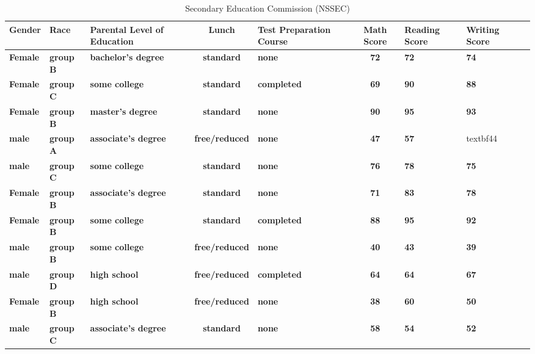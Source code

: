 \documentclass{article}
\begin{document}
	
\begin{table}[h!]
	\begin{center}
	  \caption{Secondary Education Commission (NSSEC)}
	  \label{tab:Class project 1}
	  \begin{tabular}{|l|m{1.4cm}|m{1.8cm}|c|m{1.6cm}|c|m{1.3cm}|m{1.5cm}|m{1.5cm}|}
	  	\hline
        \textbf{Gender} & \textbf{Race} & \textbf {Parental Level of Education} & \textbf{Lunch} & \textbf{Test Preparation Course} &
	  	\textbf{Math Score} & \textbf{Reading Score} & \textbf{Writing Score}\\ 
	  	\hline
	  	\textbf{Female} & \textbf{group B} & \textbf{bachelor's degree} & \textbf{standard} & \textbf{none} & \textbf{72} & \textbf{72} & \textbf{74}\\ 
	  	\hline
	  	\textbf{Female} & \textbf{group C} & \textbf{some college} & \textbf{standard} & \textbf{completed} & \textbf{69} & \textbf{90} & \textbf{88}\\
	  	\hline
	  	\textbf{Female} & \textbf{group B} & \textbf{master's degree} & \textbf{standard} & \textbf{none} & \textbf{90} & \textbf{95} & \textbf{93}\\
	  	\hline
	  	\textbf{male} & \textbf{group A} & \textbf{associate's degree} & \textbf{free/reduced} & \textbf{none} & \textbf{47} & \textbf{57} & textbf{44}\\
	  	\hline
	  	\textbf{male} & \textbf{group C} & \textbf{some college} & \textbf{standard} & \textbf{none} & \textbf{76} & \textbf{78} & \textbf{75}\\
	  	\hline
	  	\textbf{Female} & \textbf{group B} & \textbf{associate's degree} & \textbf{standard} & \textbf{none} & \textbf{71} & \textbf{83} & \textbf{78}\\
	  	\hline
	  	\textbf{Female} & \textbf{group B} & \textbf{some college} & \textbf{standard} & \textbf{completed} & \textbf{88} & \textbf{95} & \textbf{92}\\ 
	  	\hline 
	  	\textbf{male} & \textbf{group B} & \textbf{some college} & \textbf{free/reduced} & \textbf{none} & \textbf{40} & \textbf{43} & \textbf{39}\\ 
	  	\hline 
	  	\textbf{male} & \textbf{group D} & \textbf{high school} & \textbf{free/reduced} & \textbf{completed} & \textbf{64} & \textbf{64} & \textbf{67}\\ 
	  	\hline 
	  	\textbf{Female} & \textbf{group B} & \textbf{high school} & \textbf{free/reduced} & \textbf{none} & \textbf{38} & \textbf{60} & \textbf{50}\\ 
	  	\hline 
	  	\textbf{male} & \textbf{group C} & \textbf{associate's degree} & \textbf{standard} & \textbf{none} & \textbf{58} & \textbf{54} & \textbf{52}\\ 

\end{tabular}
\end{center}
\end{table}
\end{document}
